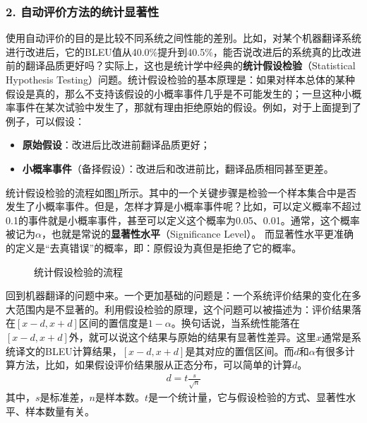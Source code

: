 \subsubsection{2. 自动评价方法的统计显著性}


\parinterval 使用自动评价的目的是比较不同系统之间性能的差别。比如，对某个机器翻译系统进行改进后，它的BLEU值从40.0$\%$提升到40.5$\%$，能否说改进后的系统真的比改进前的翻译品质更好吗？实际上，这也是统计学中经典的{\small\sffamily\bfseries{统计假设检验}}（Statistical Hypothesis Testing）问题。统计假设检验的基本原理是：如果对样本总体的某种假设是真的，那么不支持该假设的小概率事件几乎是不可能发生的；一旦这种小概率事件在某次试验中发生了，那就有理由拒绝原始的假设。例如，对于上面提到了例子，可以假设：

\begin{itemize}
\vspace{0.5em}
\item {\small\sffamily\bfseries{原始假设}}：改进后比改进前翻译品质更好；
\vspace{0.5em}
\item {\small\sffamily\bfseries{小概率事件}}（备择假设）：改进后和改进前比，翻译品质相同甚至更差。
\vspace{0.5em}
\end{itemize}

\parinterval 统计假设检验的流程如图\ref{fig:4-13}所示。其中的一个关键步骤是检验一个样本集合中是否发生了小概率事件。但是，怎样才算是小概率事件呢？比如，可以定义概率不超过0.1的事件就是小概率事件，甚至可以定义这个概率为0.05、0.01。通常，这个概率被记为$\alpha$，也就是常说的{\small\sffamily\bfseries{显著性水平}}（Significance Level）。 而显著性水平更准确的定义是“去真错误”的概率，即：原假设为真但是拒绝了它的概率。

\begin{figure}[htp]
    \centering
	
   \caption{统计假设检验的流程}
   \label{fig:4-13}
\end{figure}

\parinterval 回到机器翻译的问题中来。一个更加基础的问题是：一个系统评价结果的变化在多大范围内是不显著的。利用假设检验的原理，这个问题可以被描述为：评价结果落在$[x-d,x+d]$区间的置信度是$1-\alpha$。换句话说，当系统性能落在$[x-d, x+d]$外，就可以说这个结果与原始的结果有显著性差异。这里$x$通常是系统译文的BLEU计算结果，$[x-d,x+d]$是其对应的置信区间。而$d$和$\alpha$有很多计算方法，比如，如果假设评价结果服从正态分布，可以简单的计算$d$。
\begin{eqnarray}
d=t \frac{s}{\sqrt{n}}
\label{eq:4-21}
\end{eqnarray}
\noindent 其中，$s$是标准差，$n$是样本数。$t$是一个统计量，它与假设检验的方式、显著性水平、样本数量有关。

